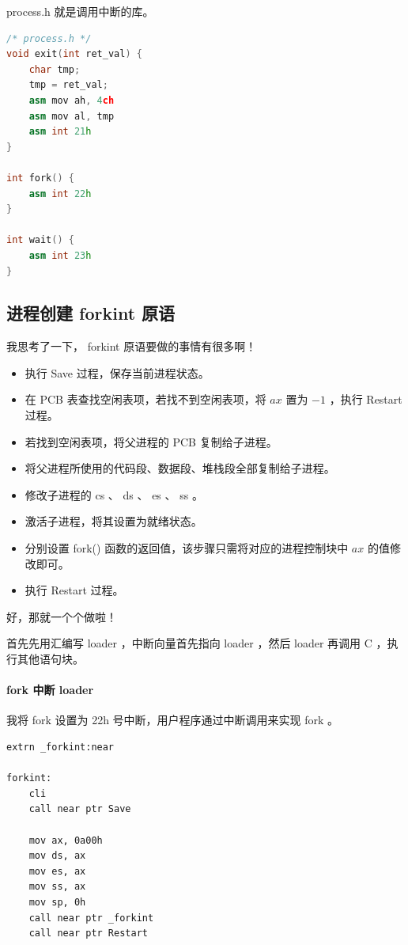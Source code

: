 \documentclass{article}
\begin{document}
process.h 就是调用中断的库。

\begin{lstlisting}[language=C++]
/* process.h */
void exit(int ret_val) {
	char tmp;
	tmp = ret_val;
	asm mov ah, 4ch
	asm mov al, tmp
	asm int 21h
}

int fork() {
	asm int 22h
}

int wait() {
	asm int 23h
}
\end{lstlisting}

\subsection{进程创建 forkint 原语}

我思考了一下， forkint 原语要做的事情有很多啊！

\begin{itemize}
\item 执行 Save 过程，保存当前进程状态。
\item 在 PCB 表查找空闲表项，若找不到空闲表项，将 $ax$ 置为 $-1$ ，执行 Restart 过程。
\item 若找到空闲表项，将父进程的 PCB 复制给子进程。
\item 将父进程所使用的代码段、数据段、堆栈段全部复制给子进程。
\item 修改子进程的 cs 、 ds 、 es 、 ss 。
\item 激活子进程，将其设置为就绪状态。
\item 分别设置 fork() 函数的返回值，该步骤只需将对应的进程控制块中 $ax$ 的值修改即可。
\item 执行 Restart 过程。
\end{itemize}

好，那就一个个做啦！

首先先用汇编写 loader ，中断向量首先指向 loader ，然后 loader 再调用 C ，执行其他语句块。

\paragraph{fork 中断 loader}

我将 fork 设置为 22h 号中断，用户程序通过中断调用来实现 fork 。

\begin{lstlisting}[language={[x86masm]Assembler}]
extrn _forkint:near

forkint:
	cli
	call near ptr Save
	
	mov ax, 0a00h
	mov ds, ax
	mov es, ax
	mov ss, ax
	mov sp, 0h
	call near ptr _forkint
	call near ptr Restart
\end{lstlisting}
\end{document}
